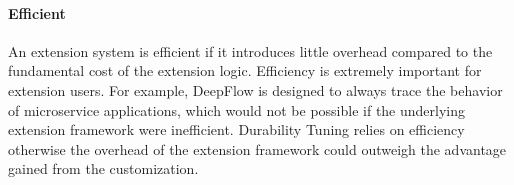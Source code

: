 \paragraph{Efficient}
An extension system is efficient if it introduces little overhead compared to the fundamental cost of the extension logic.  Efficiency is extremely important for extension users.  For example, DeepFlow is designed to always trace the behavior of microservice applications, which would not be possible if the underlying extension framework were inefficient.  Durability Tuning relies on efficiency otherwise the overhead of the extension framework could outweigh the advantage gained from the customization.




